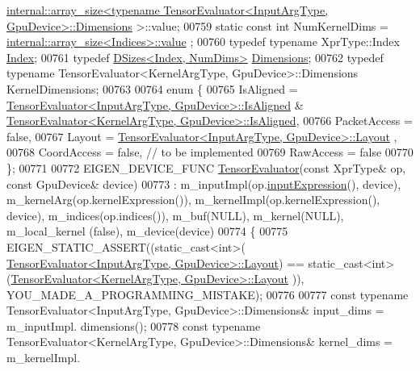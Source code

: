\begin{DoxyCode}
      \hyperlink{struct_eigen_1_1internal_1_1array__size}{internal::array\_size<typename TensorEvaluator<InputArgType, GpuDevice>::Dimensions}
      >::value;
00759   \textcolor{keyword}{static} \textcolor{keyword}{const} \textcolor{keywordtype}{int} NumKernelDims = \hyperlink{struct_eigen_1_1internal_1_1array__size}{internal::array\_size<Indices>::value}
      ;
00760   \textcolor{keyword}{typedef} \textcolor{keyword}{typename} XprType::Index \hyperlink{namespace_eigen_a62e77e0933482dafde8fe197d9a2cfde}{Index};
00761   \textcolor{keyword}{typedef} \hyperlink{struct_eigen_1_1_d_sizes}{DSizes<Index, NumDims>} \hyperlink{struct_eigen_1_1_d_sizes}{Dimensions};
00762   \textcolor{keyword}{typedef} \textcolor{keyword}{typename} TensorEvaluator<KernelArgType, GpuDevice>::Dimensions KernelDimensions;
00763 
00764   \textcolor{keyword}{enum} \{
00765     IsAligned = \hyperlink{struct_eigen_1_1_tensor_evaluator}{TensorEvaluator<InputArgType, GpuDevice>::IsAligned}
       & \hyperlink{struct_eigen_1_1_tensor_evaluator}{TensorEvaluator<KernelArgType, GpuDevice>::IsAligned},
00766     PacketAccess = \textcolor{keyword}{false},
00767     Layout = \hyperlink{struct_eigen_1_1_tensor_evaluator}{TensorEvaluator<InputArgType, GpuDevice>::Layout}
      ,
00768     CoordAccess = \textcolor{keyword}{false},  \textcolor{comment}{// to be implemented}
00769     RawAccess = \textcolor{keyword}{false}
00770   \};
00771 
00772   EIGEN\_DEVICE\_FUNC \hyperlink{struct_eigen_1_1_tensor_evaluator}{TensorEvaluator}(\textcolor{keyword}{const} XprType& op, \textcolor{keyword}{const} GpuDevice& device)
00773       : m\_inputImpl(op.\hyperlink{class_eigen_1_1_tensor_convolution_op_a57097fbe6e0a033d587e98654f0bd664}{inputExpression}(), device), m\_kernelArg(op.kernelExpression()), 
      m\_kernelImpl(op.kernelExpression(), device), m\_indices(op.indices()), m\_buf(NULL), m\_kernel(NULL), m\_local\_kernel
      (\textcolor{keyword}{false}), m\_device(device)
00774   \{
00775     EIGEN\_STATIC\_ASSERT((static\_cast<int>(
      \hyperlink{struct_eigen_1_1_tensor_evaluator}{TensorEvaluator<InputArgType, GpuDevice>::Layout}) == 
      static\_cast<int>(\hyperlink{struct_eigen_1_1_tensor_evaluator}{TensorEvaluator<KernelArgType, GpuDevice>::Layout}
      )), YOU\_MADE\_A\_PROGRAMMING\_MISTAKE);
00776 
00777     \textcolor{keyword}{const} \textcolor{keyword}{typename} TensorEvaluator<InputArgType, GpuDevice>::Dimensions& input\_dims = m\_inputImpl.
      dimensions();
00778     \textcolor{keyword}{const} \textcolor{keyword}{typename} TensorEvaluator<KernelArgType, GpuDevice>::Dimensions& kernel\_dims = m\_kernelImpl.

\end{DoxyCode}
